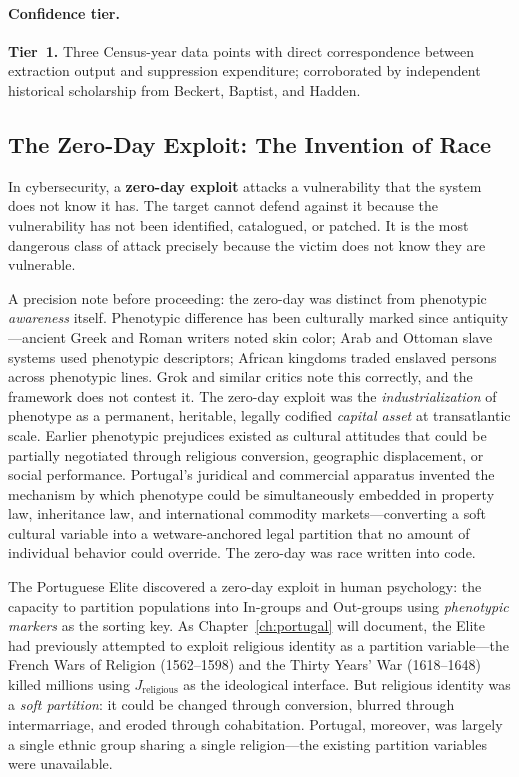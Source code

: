 \paragraph{Confidence tier.}
\textbf{Tier~1.} Three Census-year data points with direct correspondence between extraction output and suppression expenditure; corroborated by independent historical scholarship from Beckert, Baptist, and Hadden.

\subsection{The Zero-Day Exploit: The Invention of Race}

In cybersecurity, a \textbf{zero-day exploit} attacks a vulnerability that the system does not know it has. The target cannot defend against it because the vulnerability has not been identified, catalogued, or patched. It is the most dangerous class of attack precisely because the victim does not know they are vulnerable.

A precision note before proceeding: the zero-day was distinct from phenotypic \textit{awareness} itself. Phenotypic difference has been culturally marked since antiquity---ancient Greek and Roman writers noted skin color; Arab and Ottoman slave systems used phenotypic descriptors; African kingdoms traded enslaved persons across phenotypic lines. Grok and similar critics note this correctly, and the framework does not contest it. The zero-day exploit was the \textit{industrialization} of phenotype as a permanent, heritable, legally codified \textit{capital asset} at transatlantic scale. Earlier phenotypic prejudices existed as cultural attitudes that could be partially negotiated through religious conversion, geographic displacement, or social performance. Portugal's juridical and commercial apparatus invented the mechanism by which phenotype could be simultaneously embedded in property law, inheritance law, and international commodity markets---converting a soft cultural variable into a wetware-anchored legal partition that no amount of individual behavior could override. The zero-day was race written into code.

The Portuguese Elite discovered a zero-day exploit in human psychology: the capacity to partition populations into In-groups and Out-groups using \textit{phenotypic markers} as the sorting key. As Chapter~\ref{ch:portugal} will document, the Elite had previously attempted to exploit religious identity as a partition variable---the French Wars of Religion (1562--1598) and the Thirty Years' War (1618--1648) killed millions using $J_{\text{religious}}$ as the ideological interface. But religious identity was a \textit{soft partition}: it could be changed through conversion, blurred through intermarriage, and eroded through cohabitation. Portugal, moreover, was largely a single ethnic group sharing a single religion---the existing partition variables were unavailable.

